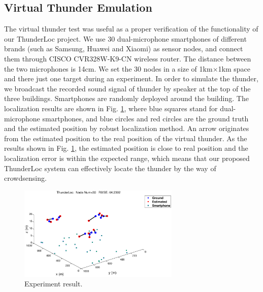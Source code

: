 \subsection{Virtual Thunder Emulation}

The virtual thunder test was useful as a proper verification of the functionality of our ThunderLoc project. 
We use 30 dual-microphone smartphones of different brands (such as Samsung, Huawei and Xiaomi) as sensor nodes, and connect them through CISCO CVR328W-K9-CN wireless router. 
The distance between the two microphones is 14cm. We set the 30 nodes in a size of 1km$\times$1km space and there just one target during an experiment.
In order to simulate the thunder, we broadcast the recorded sound signal of thunder by speaker at the top of the three buildings. 
Smartphones are randomly deployed around the building.
The localization results are shown in Fig. \ref{Virtual}, where blue squares stand for dual-microphone smartphones, and blue circles and red circles are the ground truth and the estimated position by robust localization method. 
An arrow originates from the estimated position to the real position of the virtual thunder. 
As the results shown in Fig. \ref{Virtual}, the estimated position is close to real position and the localization error is within the expected range,
which means that our proposed ThunderLoc system can effectively locate the thunder  by the way of crowdsensing.
  \begin{figure}[ht]
            \setlength{\abovecaptionskip}{0pt}
            \centering
            \includegraphics[scale=2,height=4.5cm]{image/virtual.eps}
     \vspace{2mm}
            \caption{Experiment result.}
            \label{Virtual}
            \vspace{-8mm}
  \end{figure}


